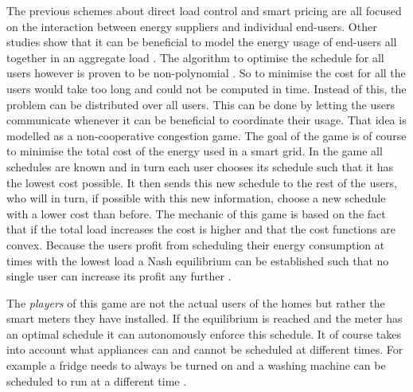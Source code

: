 The previous schemes about direct load control and smart pricing are all focused on the interaction between energy suppliers and individual end-users. Other studies show that it can be beneficial to model the energy usage of end-users all together in an aggregate load \cite{Mohsenian-RadWongJatskevichEtAl2010a, SalinasLiLi2013, ZhuTangLambotharanEtAl2011}. The algorithm to optimise the schedule for all users however is proven to be non-polynomial \cite{CaronKesidis2010}. So to minimise the cost for all the users would take too long and could not be computed in time. Instead of this, the problem can be distributed over all users. This can be done by letting the users communicate whenever it can be beneficial to coordinate their usage. That idea is modelled as a non-cooperative congestion game. The goal of the game is of course to minimise the total cost of the energy used in a smart grid. In the game all schedules are known and in turn each user chooses its schedule such that it has the lowest cost possible. It then sends this new schedule to the rest of the users, who will in turn, if possible with this new information, choose a new schedule with a lower cost than before. The mechanic of this game is based on the fact that if the total load increases the cost is higher and that the cost functions are convex. Because the users profit from scheduling their energy consumption at times with the lowest load a Nash equilibrium can be established such that no single user can increase its profit any further \cite{Mohsenian-RadWongJatskevichEtAl2010a, ZhuTangLambotharanEtAl2011, IbarsNavarroGiupponi2010}.

The \emph{players} of this game are not the actual users of the homes but rather the smart meters they have installed. If the equilibrium is reached and the meter has an optimal schedule it can autonomously enforce this schedule. It of course takes into account what appliances can and cannot be scheduled at different times. For example a fridge needs to always be turned on and a washing machine can be scheduled to run at a different time \cite{DepuruWangDevabhaktuni2011a}. 

